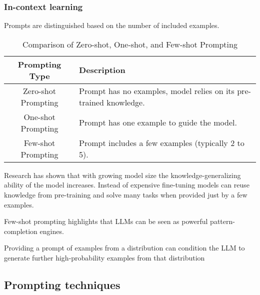 \subsubsection{In-context learning}
Prompts are distinguished based on the number of included examples.
\begin{table}[h!]
    \centering
    \begin{tabular}{|c|p{12cm}|}
    \hline
    \textbf{Prompting Type} & \textbf{Description} \\
    \hline
    Zero-shot Prompting & Prompt has no examples, model relies on its pre-trained knowledge. \\
    \hline
    One-shot Prompting & Prompt has one example to guide the model. \\
    \hline
    Few-shot Prompting & Prompt includes a few examples (typically 2 to 5). \\
    \hline
    \end{tabular}
    \caption{Comparison of Zero-shot, One-shot, and Few-shot Prompting}
\end{table}        
Research\cite{brown2020languagemodelsfewshotlearners} has shown that with growing model size the knowledge-generalizing ability of the model increases. Instead of expensive fine-tuning
models can reuse knowledge from pre-training and solve many tasks when provided just by a few examples.

Few-shot prompting highlights that LLMs can be seen as powerful pattern-completion engines. \cite{meyerson2024languagemodelcrossovervariation}

Providing a prompt of examples from a distribution can condition the LLM to generate further high-probability examples from that distribution \cite{meyerson2024languagemodelcrossovervariation}

\subsection{Prompting techniques}
